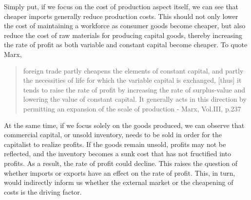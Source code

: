 \documentclass[10pt]{article}
\begin{document}
\par Simply put, if we focus on the cost of production aspect itself, we can see that cheaper imports generally reduce production costs. This should not only lower the cost of maintaining a workforce as consumer goods become cheaper, but also reduce the cost of raw materials for producing capital goods, thereby increasing the rate of profit as both variable and constant capital become cheaper.
To quote Marx, 
\begin{quote}
    foreign trade partly cheapens the elements of constant capital, and partly the necessities of life for which the variable capital is exchanged, [thus] it tends to raise the rate of profit by increasing the rate of surplus-value and lowering the value of constant capital. It generally acts in this direction by permitting an expansion of the scale of production - Marx, Vol.III, p.237
\end{quote} 
\par At the same time, if we focus solely on the goods produced, we can observe that commercial capital, or unsold inventory, needs to be sold in order for the capitalist to realize profits. If the goods remain unsold, profits may not be reflected, and the inventory becomes a sunk cost that has not fructified into profits. As a result, the rate of profit could decline. This raises the question of whether imports or exports have an effect on the rate of profit. This, in turn, would indirectly inform us whether the external market or the cheapening of costs is the driving factor.
  
\end{document}

